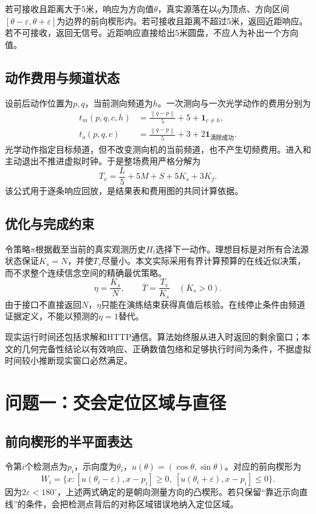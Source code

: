 \documentclass[UTF8,a4paper,12pt,fontset=fandol]{ctexart}
\newcommand{\norm}[1]{\left\lVert#1\right\rVert}
\newcommand{\nextpage}{\clearpage}
\begin{document}
若可接收且距离大于5米，响应为方向值$\theta$，真实源落在以$q$为顶点、方向区间$[\theta-\varepsilon,\theta+\varepsilon]$为边界的前向楔形内。若可接收且距离不超过5米，返回近距响应。若不可接收，返回无信号。近距响应直接给出5米圆盘，不应人为补出一个方向值。

\subsection{动作费用与频道状态}
设前后动作位置为$p,q$，当前测向频道为$h$。一次测向与一次光学动作的费用分别为
\begin{align}
 t_m(p,q,c,h)&=\frac{\norm{q-p}}5+5+\mathbf1_{c\ne h},\\
 t_o(p,q,c)&=\frac{\norm{q-p}}5+3+2\mathbf1_{\text{清除成功}}.
\end{align}
光学动作指定目标频道，但不改变测向机的当前频道，也不产生切频费用\cite{interface}。进入和主动退出不推进虚拟时钟。于是整场费用严格分解为
\begin{equation}\label{eq:cost}
 T_v=\frac L5+5M+S+5K_s+3K_f.
\end{equation}
该公式用于逐条响应回放，是结果表和费用图的共同计算依据。

\subsection{优化与完成约束}
令策略$\pi$根据截至当前的真实观测历史$H_t$选择下一动作。理想目标是对所有合法源状态保证$K_s=N$，并使$T_v$尽量小。本文实际采用有界计算预算的在线近似决策，而不求整个连续信念空间的精确最优策略。
\begin{equation}
 \eta=\frac{K_s}{N},\qquad \overline T=\frac{T_v}{K_s}\quad(K_s>0).
\end{equation}
由于接口不直接返回$N$，$\eta$只能在演练结束获得真值后核验。在线停止条件由频道证据定义，不能以预测的$\eta=1$替代。

现实运行时间还包括求解和HTTP通信。算法始终服从进入时返回的剩余窗口；本文的几何完备性结论以有效响应、正确数值包络和足够执行时间为条件，不据虚拟时间较小推断现实窗口必然满足。

\nextpage
\section{问题一：交会定位区域与直径}
\subsection{前向楔形的半平面表达}
令第$i$个检测点为$p_i$，示向度为$\theta_i$，$u(\theta)=(\cos\theta,\sin\theta)$。对应的前向楔形为
\begin{equation}
 W_i=\{x:[u(\theta_i-\varepsilon),x-p_i]\ge0,\ [u(\theta_i+\varepsilon),x-p_i]\le0\}.
\end{equation}
因为$2\varepsilon<180^\circ$，上述两式确定的是朝向测量方向的凸楔形。若只保留“靠近示向直线”的条件，会把检测点背后的对称区域错误地纳入定位区域。
\end{document}
